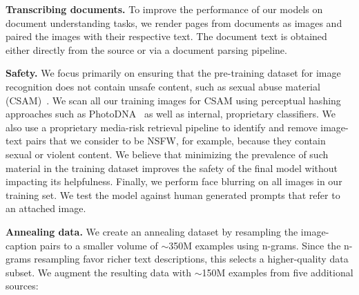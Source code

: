 \textbf{Transcribing documents.} To improve the performance of our models on document understanding tasks, we render pages from documents as images and paired the images with their respective text. The document text is obtained either directly from the source or via a document parsing pipeline.

\textbf{Safety.}
We focus primarily on ensuring that the pre-training dataset for image recognition does not contain unsafe content, such as sexual abuse material (CSAM)~\citep{thiel2023csam}. We scan all our training images for CSAM using perceptual hashing approaches such as PhotoDNA~\citep{farid2021overview} as well as internal, proprietary classifiers.
We also use a proprietary media-risk retrieval pipeline to identify and remove image-text pairs that we consider to be NSFW, for example, because they contain sexual or violent content.
We believe that minimizing the prevalence of such material in the training dataset improves the safety of the final model without impacting its helpfulness.
Finally, we perform face blurring on all images in our training set.
We test the model against human generated prompts that refer to an attached image.

\textbf{Annealing data.} We create an annealing dataset by resampling the image-caption pairs to a smaller volume of $\sim$350M examples using n-grams.
Since the n-grams resampling favor richer text descriptions, this selects a higher-quality data subset.
We augment the resulting data with $\sim$150M examples from five additional sources:


